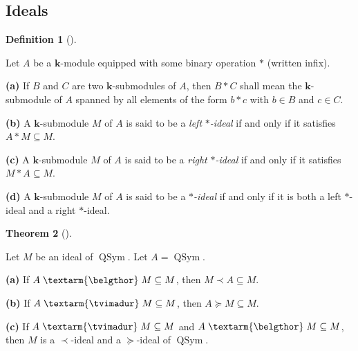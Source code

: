 \documentclass[numbers=enddot,12pt,final,onecolumn,notitlepage]{scrartcl}%
\theoremstyle{definition}
\newtheorem{theo}{Theorem}[section]
\newenvironment{theorem}[1][]
{\begin{theo}[#1]\begin{leftbar}}
{\end{leftbar}\end{theo}}
\newtheorem{defi}[theo]{Definition}
\newenvironment{definition}[1][]
{\begin{defi}[#1]\begin{leftbar}}
{\end{leftbar}\end{defi}}
\newcommand{\tvi}{\left. \textarm{\tvimadur} \right.}
\newcommand{\bel}{\left. \textarm{\belgthor} \right.}
\begin{document}
\subsection{Ideals}

\begin{definition}
Let $A$ be a $\mathbf{k}$-module equipped with some binary operation $\ast$
(written infix).

\textbf{(a)} If $B$ and $C$ are two $\mathbf{k}$-submodules of $A$, then
$B\ast C$ shall mean the $\mathbf{k}$-submodule of $A$ spanned by all elements
of the form $b\ast c$ with $b\in B$ and $c\in C$.

\textbf{(b)} A $\mathbf{k}$-submodule $M$ of $A$ is said to be a \textit{left
}$\ast$\textit{-ideal} if and only if it satisfies $A\ast M\subseteq M$.

\textbf{(c)} A $\mathbf{k}$-submodule $M$ of $A$ is said to be a \textit{right
}$\ast$\textit{-ideal} if and only if it satisfies $M\ast A\subseteq M$.

\textbf{(d)} A $\mathbf{k}$-submodule $M$ of $A$ is said to be a\textit{
}$\ast$\textit{-ideal} if and only if it is both a left $\ast$-ideal and a
right $\ast$-ideal.
\end{definition}

\begin{theorem}
\label{thm.ideal-crit2}Let $M$ be an ideal of $\operatorname*{QSym}$. Let
$A=\operatorname*{QSym}$.

\textbf{(a)} If $A\bel  M\subseteq M$, then $M\left.  \prec\right.  A\subseteq
M$.

\textbf{(b)} If $A\tvi  M\subseteq M$, then $A\left.  \succeq\right.
M\subseteq M$.

\textbf{(c)} If $A\tvi  M\subseteq M$ and $A\bel  M\subseteq M$, then $M$ is a
$\left.  \prec\right.  $-ideal and a $\left.  \succeq\right.  $-ideal of
$\operatorname*{QSym}$.
\end{theorem}
\end{document}
